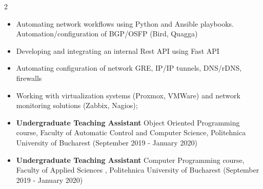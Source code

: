 \documentclass[10pt,a4paper,ragged2e,withhyper]{altacv}
\begin{document}
\begin{paracol}{2}
\divider

\begin{itemize}
\item Automating network workflows using Python and Ansible playbooks. Automation/configuration of BGP/OSFP (Bird, Quagga)
\item Developing and integrating an internal Rest API using Fast API
\item Automating configuration of network GRE, IP/IP tunnels, \newline DNS/rDNS, firewalls
\item Working with virtualization systems (Proxmox, VMWare) and network monitoring solutions (Zabbix, Nagios);
\end{itemize}

\divider

\medskip

\switchcolumn




\begin{itemize}

\item {\textbf{Undergraduate Teaching Assistant} \newline Object Oriented Programming course, Faculty of Automatic Control and Computer Science, Politehnica University of Bucharest} {(September 2019 - January 2020)}
\item {\textbf{Undergraduate Teaching Assistant} \newline Computer Programming course, Faculty of Applied Sciences , Politehnica University of Bucharest} {(September 2019 - January 2020)}
\end{itemize}
\medskip



\end{paracol}
\end{document}
